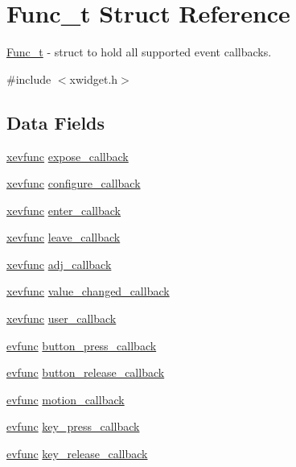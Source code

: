 \hypertarget{structFunc__t}{}\section{Func\+\_\+t Struct Reference}
\label{structFunc__t}


\hyperlink{structFunc__t}{Func\+\_\+t} -\/ struct to hold all supported event callbacks.  




{\ttfamily \#include $<$xwidget.\+h$>$}

\subsection*{Data Fields}
\begin{DoxyCompactItemize}
\item 
\hyperlink{xwidget_8h_a9ef0263424a7f5f8f6b02055fca67ddd}{xevfunc} \hyperlink{structFunc__t_ae4ba307ec29bfea83e1197aa750c1396}{expose\+\_\+callback}
\item 
\hyperlink{xwidget_8h_a9ef0263424a7f5f8f6b02055fca67ddd}{xevfunc} \hyperlink{structFunc__t_a7876670d3bb74b11ab93fe81908d04b0}{configure\+\_\+callback}
\item 
\hyperlink{xwidget_8h_a9ef0263424a7f5f8f6b02055fca67ddd}{xevfunc} \hyperlink{structFunc__t_a6ae24f219bf8eff4bd5fbdfa3f29c14d}{enter\+\_\+callback}
\item 
\hyperlink{xwidget_8h_a9ef0263424a7f5f8f6b02055fca67ddd}{xevfunc} \hyperlink{structFunc__t_a1801ba902bd7efc706d474312f960d0a}{leave\+\_\+callback}
\item 
\hyperlink{xwidget_8h_a9ef0263424a7f5f8f6b02055fca67ddd}{xevfunc} \hyperlink{structFunc__t_afe804d94b970050a9f85530408169623}{adj\+\_\+callback}
\item 
\hyperlink{xwidget_8h_a9ef0263424a7f5f8f6b02055fca67ddd}{xevfunc} \hyperlink{structFunc__t_acce396ccf3266886f0a6d28cf45761d3}{value\+\_\+changed\+\_\+callback}
\item 
\hyperlink{xwidget_8h_a9ef0263424a7f5f8f6b02055fca67ddd}{xevfunc} \hyperlink{structFunc__t_a1f089cb13a39764a1f980470a51db71b}{user\+\_\+callback}
\item 
\hyperlink{xwidget_8h_ab4ae973f86a383c8c0f92b709044520a}{evfunc} \hyperlink{structFunc__t_aa58bc35a1499d8cd850d2a083ad016f1}{button\+\_\+press\+\_\+callback}
\item 
\hyperlink{xwidget_8h_ab4ae973f86a383c8c0f92b709044520a}{evfunc} \hyperlink{structFunc__t_a8cb9d8135a178027675c96599ff8312e}{button\+\_\+release\+\_\+callback}
\item 
\hyperlink{xwidget_8h_ab4ae973f86a383c8c0f92b709044520a}{evfunc} \hyperlink{structFunc__t_ac2842c834907f4aeace8f404c6cc7621}{motion\+\_\+callback}
\item 
\hyperlink{xwidget_8h_ab4ae973f86a383c8c0f92b709044520a}{evfunc} \hyperlink{structFunc__t_a024ea4919029156d9415f1501cd8b0bf}{key\+\_\+press\+\_\+callback}
\item 
\hyperlink{xwidget_8h_ab4ae973f86a383c8c0f92b709044520a}{evfunc} \hyperlink{structFunc__t_a8c7138616caa404a9af064d673d7e0f8}{key\+\_\+release\+\_\+callback}
\end{DoxyCompactItemize}


